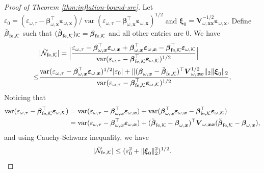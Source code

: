 \documentclass[12pt]{article}
\newcommand{\var}{\operatorname{var}}
\newcommand{\mk}{\mathcal{K}}
\newcommand{\fe}{\textnormal{fe}}
\newcommand{\bs}{\boldsymbol}
\begin{document}
\begin{proof}[Proof of Theorem \ref{thm:inflation-bound-sre}]
Let $\varepsilon_0 = (\varepsilon_{\omega,\tau}- \bs{\beta}_{\omega, \bs{x}}^\top \bs{\varepsilon}_{\omega, \bs{x}})/\var(\varepsilon_{\omega,\tau}- \bs{\beta}_{\omega, \bs{x}}^\top \bs{\varepsilon}_{\omega, \bs{x}})^{1/2}$ and $\bs{\xi}_{0} = \bs{V}_{\omega, \bs{x}\bs{x}}^{-1/2}\bs{\varepsilon}_{\omega,\bs{x}}$. Define 
$\tilde{\bs{\beta}}_{\fe ,\mk}$ such that $(\tilde{\bs{\beta}}_{\fe ,\mk})_{\mk}=\bs{\beta}_{\fe ,\mk}$  and all other entries are $0$. We have
\begin{align*}
    & |\tilde{\mathcal{N}}_{\fe ,\mk}| = \Big|\frac{\varepsilon_{\omega,\tau}-\bs{\beta}_{\omega, \bs{x}}^\top\bs{\varepsilon}_{\omega,\bs{x}} + \bs{\beta}_{\omega, \bs{x}}^\top\bs{\varepsilon}_{\omega,\bs{x}} -\bs{\beta}_{\fe , \mk}^\top \bs{\varepsilon}_{\omega, \mk}}{\var(\varepsilon_{\omega,\tau}-\bs{\beta}_{\fe ,\mk}^\top \bs{\varepsilon}_{\omega, \mk})^{1/2}}\Big|\\
\leq & \frac{\var(\varepsilon_{\omega,\tau}-\bs{\beta}_{\omega, \bs{x}}^\top\bs{\varepsilon}_{\omega,\bs{x}})^{1/2}|\varepsilon_0| + \|(\bs{\beta}_{\omega, \bs{x}} -\tilde{\bs{\beta}}_{\fe , \mk})^\top \bs{V}_{\omega,\bs{x}\bs{x}}^{1/2}\|_2\|\bs{\xi}_0\|_2}{\var(\varepsilon_{\omega,\tau}-\bs{\beta}_{\fe, \mk}^\top \bs{\varepsilon}_{\omega, \mk})^{1/2}},
\end{align*}
Noticing that
\begin{align*}
    \var(\varepsilon_{\omega,\tau}-\bs{\beta}_{\fe, \mk}^\top \bs{\varepsilon}_{\omega, \mk}) &= \var(\varepsilon_{\omega,\tau}-\bs{\beta}_{\omega, \bs{x}}^\top\bs{\varepsilon}_{\omega,\bs{x}}) + \var(\bs{\beta}_{\omega, \bs{x}}^\top\bs{\varepsilon}_{\omega,\bs{x}} -\bs{\beta}_{\fe , \mk}^\top \bs{\varepsilon}_{\omega, \mk})\\
    &= \var(\varepsilon_{\omega,\tau}-\bs{\beta}_{\omega, \bs{x}}^\top\bs{\varepsilon}_{\omega,\bs{x}}) + (\tilde{\bs{\beta}}_{\fe , \mk} -\bs{\beta}_{\omega, \bs{x}})^\top \bs{V}_{\omega,\bs{x}\bs{x}}(\tilde{\bs{\beta}}_{\fe , \mk} -\bs{\beta}_{\omega, \bs{x}}),
\end{align*}
and using Cauchy-Schwarz inequality, we have
\begin{align*}
    |\tilde{\mathcal{N}}_{\fe ,\mk}| \leq (\varepsilon_0^2 + \|\bs{\xi}_0\|_2^2)^{1/2}.
\end{align*}


\end{proof}
\end{document}
